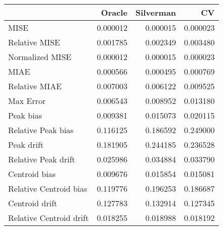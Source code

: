\begin{tabular}{lrrr}
  \hline
 & Oracle & Silverman & CV \\ 
  \hline
MISE & 0.000012 & 0.000015 & 0.000023 \\ 
  Relative MISE & 0.001785 & 0.002349 & 0.003480 \\ 
  Normalized MISE & 0.000012 & 0.000015 & 0.000023 \\ 
  MIAE & 0.000566 & 0.000495 & 0.000769 \\ 
  Relative MIAE & 0.007003 & 0.006122 & 0.009525 \\ 
  Max Error & 0.006543 & 0.008952 & 0.013180 \\ 
  Peak bias & 0.009381 & 0.015073 & 0.020115 \\ 
  Relative Peak bias & 0.116125 & 0.186592 & 0.249000 \\ 
  Peak drift & 0.181905 & 0.244185 & 0.236528 \\ 
  Relative Peak drift & 0.025986 & 0.034884 & 0.033790 \\ 
  Centroid bias & 0.009676 & 0.015854 & 0.015081 \\ 
  Relative Centroid bias & 0.119776 & 0.196253 & 0.186687 \\ 
  Centroid drift & 0.127783 & 0.132914 & 0.127345 \\ 
  Relative Centroid drift & 0.018255 & 0.018988 & 0.018192 \\ 
   \hline
\end{tabular}
